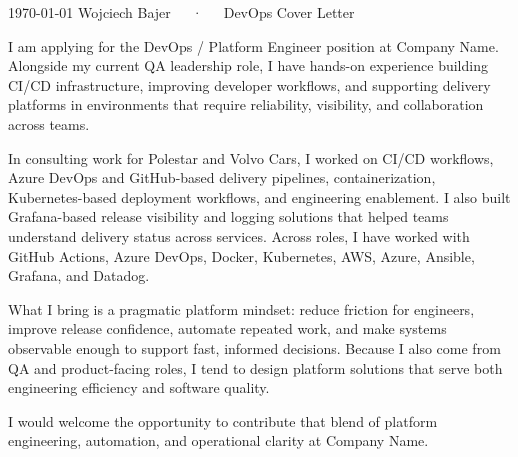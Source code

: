 \documentclass[11pt, a4paper]{awesome-cv}
\begin{document}
\makecvheader[R]
\makecvfooter
  {\today}
  {Wojciech Bajer~~~·~~~DevOps Cover Letter}
  {}

\makelettertitle

\begin{cvletter}

I am applying for the DevOps / Platform Engineer position at Company Name. Alongside my current QA leadership role, I have hands-on experience building CI/CD infrastructure, improving developer workflows, and supporting delivery platforms in environments that require reliability, visibility, and collaboration across teams.

In consulting work for Polestar and Volvo Cars, I worked on CI/CD workflows, Azure DevOps and GitHub-based delivery pipelines, containerization, Kubernetes-based deployment workflows, and engineering enablement. I also built Grafana-based release visibility and logging solutions that helped teams understand delivery status across services. Across roles, I have worked with GitHub Actions, Azure DevOps, Docker, Kubernetes, AWS, Azure, Ansible, Grafana, and Datadog.

What I bring is a pragmatic platform mindset: reduce friction for engineers, improve release confidence, automate repeated work, and make systems observable enough to support fast, informed decisions. Because I also come from QA and product-facing roles, I tend to design platform solutions that serve both engineering efficiency and software quality.

I would welcome the opportunity to contribute that blend of platform engineering, automation, and operational clarity at Company Name.

\end{cvletter}

\makeletterclosing
\end{document}
